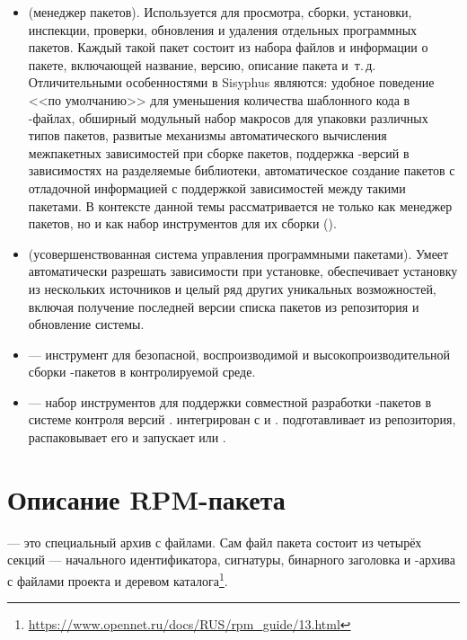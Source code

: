 \begin{itemize}
	\item {} (менеджер пакетов). Используется для просмотра, сборки, установки, инспекции, 
		проверки, обновления и удаления отдельных программных пакетов. Каждый такой пакет состоит 
		из набора файлов и информации о пакете, включающей название, версию, описание пакета и~т.\,д. 
		Отличительными особенностями  в Sisyphus являются: удобное поведение <<по умолчанию>> 
		для уменьшения количества шаблонного кода в -файлах, обширный модульный набор 
		макросов для упаковки различных типов пакетов, развитые механизмы автоматического вычисления 
		межпакетных зависимостей при сборке пакетов, поддержка -версий в зависимостях на 
		разделяемые библиотеки, автоматическое создание пакетов с отладочной информацией с поддержкой 
		зависимостей между такими пакетами. В контексте данной темы  рассматривается не только 
		как менеджер пакетов, но и как набор инструментов для их сборки (). 
	\item {} (усовершенствованная система управления программными пакетами). Умеет автоматически 
		разрешать зависимости при установке, обеспечивает установку из нескольких источников и целый 
		ряд других уникальных возможностей, включая получение последней версии списка пакетов из 
		репозитория и обновление системы.
	\item {} --- инструмент для безопасной, воспроизводимой и высокопроизводительной сборки 
		-пакетов в контролируемой среде.
	\item {} --- набор инструментов для поддержки совместной разработки -пакетов в 
		системе контроля версий .  интегрирован с  и . 
		 подготавливает  из  репозитория, распаковывает его и запускает 
		 или .
\end{itemize}


\hypertarget{3.1}{\section{Описание RPM-пакета}}
 --- это специальный архив с файлами. Сам файл пакета состоит из четырёх секций --- 
начального идентификатора, сигнатуры, бинарного заголовка и -архива с файлами проекта и деревом 
каталога\footnote{\href{https://www.opennet.ru/docs/RUS/rpm_guide/13.html}{https://www.opennet.ru/docs/RUS/rpm\_guide/13.html}}.

